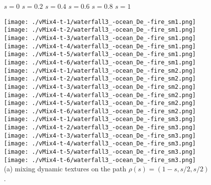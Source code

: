 \begin{figure}[ht!]
{\centering
{\raggedright
 \hspace{0.7cm} $s=0$ \hspace{0.82cm}  $s=0.2$ \hspace{0.82cm} $s=0.4$ \hspace{0.82cm}  $s=0.6$ \hspace{0.82cm}  $s=0.8$ \hspace{0.82cm}  $s=1$\\
}
\vspace{1mm}
    \texttt{[image: ./vMix4-t-1/waterfall3\_-ocean\_De\_-fire\_sm1.png]}
    \texttt{[image: ./vMix4-t-2/waterfall3\_-ocean\_De\_-fire\_sm1.png]}
    \texttt{[image: ./vMix4-t-3/waterfall3\_-ocean\_De\_-fire\_sm1.png]}
    \texttt{[image: ./vMix4-t-4/waterfall3\_-ocean\_De\_-fire\_sm1.png]}
    \texttt{[image: ./vMix4-t-5/waterfall3\_-ocean\_De\_-fire\_sm1.png]}
    \texttt{[image: ./vMix4-t-6/waterfall3\_-ocean\_De\_-fire\_sm1.png]}\\
\vspace{1mm}
    \texttt{[image: ./vMix4-t-1/waterfall3\_-ocean\_De\_-fire\_sm2.png]}
    \texttt{[image: ./vMix4-t-2/waterfall3\_-ocean\_De\_-fire\_sm2.png]}
    \texttt{[image: ./vMix4-t-3/waterfall3\_-ocean\_De\_-fire\_sm2.png]}
    \texttt{[image: ./vMix4-t-4/waterfall3\_-ocean\_De\_-fire\_sm2.png]}
    \texttt{[image: ./vMix4-t-5/waterfall3\_-ocean\_De\_-fire\_sm2.png]}
    \texttt{[image: ./vMix4-t-6/waterfall3\_-ocean\_De\_-fire\_sm2.png]}\\
\vspace{1mm}
    \texttt{[image: ./vMix4-t-1/waterfall3\_-ocean\_De\_-fire\_sm3.png]}
    \texttt{[image: ./vMix4-t-2/waterfall3\_-ocean\_De\_-fire\_sm3.png]}
    \texttt{[image: ./vMix4-t-3/waterfall3\_-ocean\_De\_-fire\_sm3.png]}
    \texttt{[image: ./vMix4-t-4/waterfall3\_-ocean\_De\_-fire\_sm3.png]}
    \texttt{[image: ./vMix4-t-5/waterfall3\_-ocean\_De\_-fire\_sm3.png]}
    \texttt{[image: ./vMix4-t-6/waterfall3\_-ocean\_De\_-fire\_sm3.png]}\\
\vspace{1mm}
(a) mixing dynamic textures on the path $\rho(s) = (1-s, s/2, s/2)$.\\
}
\end{figure}

